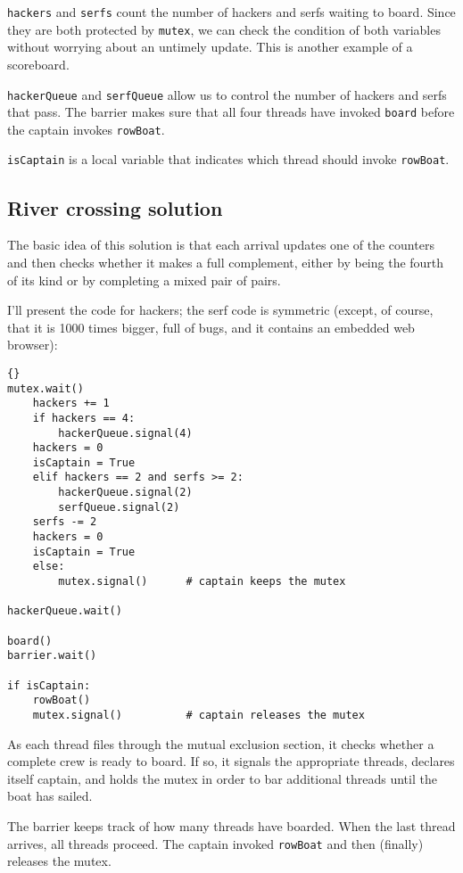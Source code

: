 \documentclass{book}
\newcommand{\clearemptydoublepage}{\newpage\cleardoublepage}
\begin{document}
{\tt hackers} and {\tt serfs} count the number of hackers
and serfs waiting to board.  Since they are both protected by
{\tt mutex}, we can check the condition of both variables without
worrying about an untimely update.  This is another example
of a scoreboard.

{\tt hackerQueue} and {\tt serfQueue} allow us to control the number
of hackers and serfs that pass.  The barrier
makes sure that all four threads have invoked
{\tt board} before the captain invokes {\tt rowBoat}.

{\tt isCaptain} is a local variable that
indicates which thread should invoke {\tt rowBoat}.

\clearemptydoublepage
\subsection {River crossing solution}

The basic idea of this solution is that each arrival updates
one of the counters and then checks whether it makes a
full complement, either by being the fourth of its kind or
by completing a mixed pair of pairs.

I'll present the code for hackers; the serf code is
symmetric (except, of course, that it is 1000 times bigger,
full of bugs, and it contains an embedded web browser):

\begin{lstlisting}[title={River crossing solution}]{}
mutex.wait()
    hackers += 1
    if hackers == 4:
        hackerQueue.signal(4)                
	hackers = 0
	isCaptain = True
    elif hackers == 2 and serfs >= 2:
        hackerQueue.signal(2)                
        serfQueue.signal(2)                  
	serfs -= 2
	hackers = 0
	isCaptain = True
    else:
        mutex.signal()      # captain keeps the mutex

hackerQueue.wait()           

board()
barrier.wait()            

if isCaptain:
    rowBoat()
    mutex.signal()          # captain releases the mutex
\end{lstlisting}

As each thread files through the mutual exclusion section, it
checks whether a complete crew is ready to board.  If so, it
signals the appropriate threads, declares itself captain, and
holds the mutex in order to bar additional threads until the
boat has sailed.

The barrier keeps track of how many threads have boarded.
When the last thread arrives, all threads proceed.
The captain invoked {\tt rowBoat} and then (finally) releases the mutex.
\end{document}
